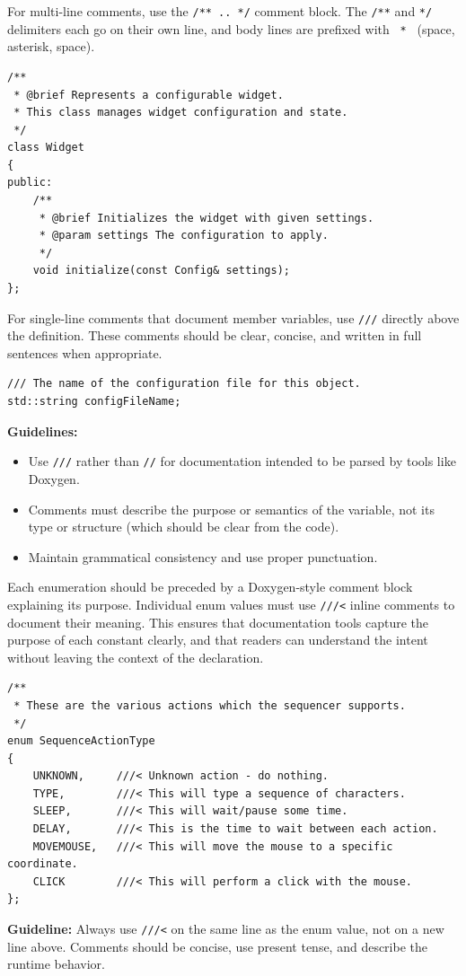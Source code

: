 For multi-line comments, use the \texttt{/** .. */} comment block. The \texttt{/**} and \texttt{*/} delimiters each go on their own line, and body lines are prefixed with \texttt{ * } (space, asterisk, space).
\begin{lstlisting}[style=cppstyle]
/**
 * @brief Represents a configurable widget.
 * This class manages widget configuration and state.
 */
class Widget 
{
public:
    /**
     * @brief Initializes the widget with given settings.
     * @param settings The configuration to apply.
     */
    void initialize(const Config& settings);
};
\end{lstlisting}
For single-line comments that document member variables, use \texttt{///} directly above the definition. These comments should be clear, concise, and written in full sentences when appropriate.
\begin{lstlisting}[style=cppstyle]
/// The name of the configuration file for this object.
std::string configFileName;
\end{lstlisting}
\textbf{Guidelines:}
\begin{itemize}\itemsep0em
    \item Use \texttt{///} rather than \texttt{//} for documentation intended to be parsed by tools like Doxygen.
    \item Comments must describe the purpose or semantics of the variable, not its type or structure (which should be clear from the code).
    \item Maintain grammatical consistency and use proper punctuation.
\end{itemize}
Each enumeration should be preceded by a Doxygen-style comment block explaining its purpose. Individual enum values must use \texttt{///<} inline comments to document their meaning. This ensures that documentation tools capture the purpose of each constant clearly, and that readers can understand the intent without leaving the context of the declaration.
\begin{lstlisting}[style=cppstyle]
/**
 * These are the various actions which the sequencer supports.
 */
enum SequenceActionType
{
    UNKNOWN,     ///< Unknown action - do nothing.
    TYPE,        ///< This will type a sequence of characters.
    SLEEP,       ///< This will wait/pause some time.
    DELAY,       ///< This is the time to wait between each action.
    MOVEMOUSE,   ///< This will move the mouse to a specific coordinate.
    CLICK        ///< This will perform a click with the mouse.
};
\end{lstlisting}
\textbf{Guideline:} Always use \texttt{///<} on the same line as the enum value, not on a new line above. Comments should be concise, use present tense, and describe the runtime behavior.


